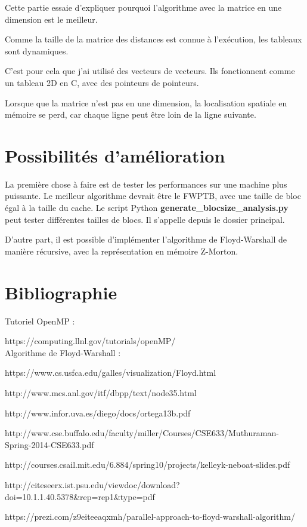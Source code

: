 \documentclass[a4paper,11pt]{article}
\begin{document}
Cette partie essaie d'expliquer pourquoi l'algorithme avec la matrice en une dimension est le meilleur.

Comme la taille de la matrice des distances est connue à l'exécution, les tableaux sont dynamiques.

C'est pour cela que j'ai utilisé des vecteurs de vecteurs. Ils fonctionnent comme un tableau 2D en C, avec des pointeurs de pointeurs.

Lorsque que la matrice n'est pas en une dimension, la localisation spatiale en mémoire se perd, car chaque ligne peut être loin de la ligne suivante.

\section{Possibilités d'amélioration}

La première chose à faire est de tester les performances sur une machine plus puissante. Le meilleur algorithme devrait être le FWPTB, avec une taille de bloc égal à la taille du cache. Le script Python \textbf{generate\_blocsize\_analysis.py} peut tester différentes tailles de blocs. Il s'appelle depuis le dossier principal.

D'autre part, il est possible d'implémenter l'algorithme de Floyd-Warshall de manière récursive, avec la représentation en mémoire Z-Morton.

\section{Bibliographie}

Tutoriel OpenMP :

https://computing.llnl.gov/tutorials/openMP/\\

\noindent Algorithme de Floyd-Warshall :

https://www.cs.usfca.edu/galles/visualization/Floyd.html

http://www.mcs.anl.gov/itf/dbpp/text/node35.html

http://www.infor.uva.es/diego/docs/ortega13b.pdf

http://www.cse.buffalo.edu/faculty/miller/Courses/CSE633/Muthuraman-Spring-2014-CSE633.pdf

http://courses.csail.mit.edu/6.884/spring10/projects/kelleyk-neboat-slides.pdf

http://citeseerx.ist.psu.edu/viewdoc/download?doi=10.1.1.40.5378\&rep=rep1\&type=pdf

https://prezi.com/z9eiteeaqxmh/parallel-approach-to-floyd-warshall-algorithm/
\end{document}
